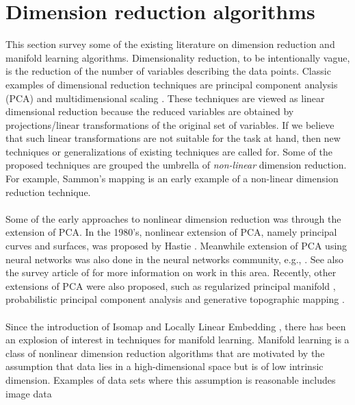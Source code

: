 \section{Dimension reduction algorithms}
\label{sec:dimens-reduct-algor}
This section survey some of the existing literature on dimension 
reduction and manifold learning algorithms. 
Dimensionality reduction, to be intentionally vague, is the reduction
of the number of variables describing the data points. Classic
examples of dimensional reduction techniques are principal component
analysis (PCA) \citep{pearson01:_on,hotelling33:_analy} and
multidimensional scaling
\citep{torgesen52:_multid,gower66:_some}. These techniques are viewed
as linear dimensional reduction because the reduced variables are
obtained by projections/linear transformations of the original set of
variables. If we believe that such linear transformations are not
suitable for the task at hand, then new techniques or generalizations
of existing techniques are called for. Some of the proposed techniques
are grouped the umbrella of \emph{non-linear} dimension reduction. For
example, Sammon's mapping \cite{j.69:_nonlin} is an early example of
a non-linear dimension reduction technique. \\ \\
%
\noindent
Some of the early approaches to nonlinear
dimension reduction was through the extension of PCA. In the
1980's, nonlinear extension of PCA, namely principal curves and
surfaces, was proposed by Hastie
\citet{hastie84:_princ,hastie89:_princ}. Meanwhile extension of PCA
using neural networks was also done in the neural networks community,
e.g., \citet{rubner89,oja92:_princ}.  See also the survey article of
\citet{oja02:_unsup} for more information on work in this
area. Recently, other extensions of PCA were also proposed, such as
regularized principal manifold \citet{smola01:_regul_princ_manif} ,
probabilistic principal component analysis \citet{tipping99:_mixtur}
and generative topographic mapping
\citet{bishop98:_gtm}. \\ \\
%
% 
\noindent Since the introduction of Isomap
\citep{tenebaum00:_global_geomet_framew_nonlin_dimen_reduc} and
Locally Linear Embedding \citep{roweis00:_nonlin}, there has been an
explosion of interest in techniques for manifold learning. Manifold
learning is a class of nonlinear dimension reduction algorithms that
are motivated by the assumption that data lies in a high-dimensional
space but is of low intrinsic dimension. Examples of data sets where
this assumption is reasonable includes image data
